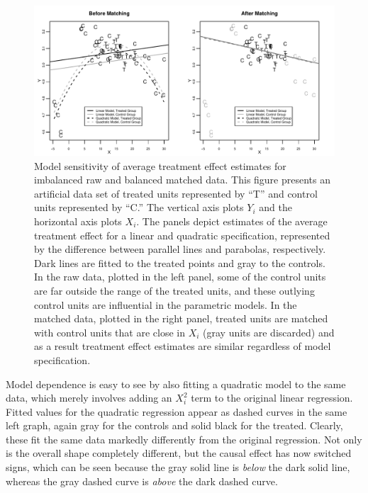 \documentclass[11pt,titlepage]{article}
\begin{document}
\begin{figure}[t] 
 \begin{center}
   \includegraphics[width=6in]{figs/olspanel-thick.pdf}
  \end{center}
  \vspace{-0.275in}
  \caption{Model sensitivity of average treatment effect estimates for
    imbalanced raw and balanced matched data.  This figure presents an
    artificial data set of treated units represented by ``T'' and
    control units represented by ``C.'' The vertical axis plots $Y_i$
    and the horizontal axis plots $X_i$.  The panels depict estimates
    of the average treatment effect for a linear and quadratic
    specification, represented by the difference between parallel
    lines and parabolas, respectively.  Dark lines are fitted to the
    treated points and gray to the controls.  In the raw data, plotted
    in the left panel, some of the control units are far outside the
    range of the treated units, and these outlying control units are
    influential in the parametric models.  In the matched data,
    plotted in the right panel, treated units are matched with control
    units that are close in $X_i$ (gray units are discarded) and as a
    result treatment effect estimates are similar regardless of model
    specification.}
  \label{fg:extrap}
\end{figure}

Model dependence is easy to see by also fitting a quadratic model to
the same data, which merely involves adding an $X_i^2$ term to the
original linear regression.  Fitted values for the quadratic
regression appear as dashed curves in the same left graph, again gray
for the controls and solid black for the treated.  Clearly, these fit
the same data markedly differently from the original regression.  Not
only is the overall shape completely different, but the causal effect
has now switched signs, which can be seen because the gray solid line
is \emph{below} the dark solid line, whereas the gray dashed curve is
\emph{above} the dark dashed curve.
\end{document}
